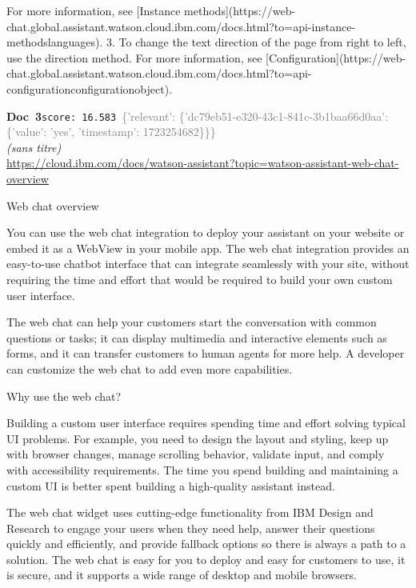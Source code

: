 \documentclass[a4paper,11pt]{article}
\begin{document}
\begin{docenv}
{For more information, see [Instance methods](https://web-chat.global.assistant.watson.cloud.ibm.com/docs.html?to=api-instance-methodslanguages).
3.  To change the text direction of the page from right to left, use the direction method. For more information, see [Configuration](https://web-chat.global.assistant.watson.cloud.ibm.com/docs.html?to=api-configurationconfigurationobject).









}
\end{docenv}
\begin{docenv}
{\footnotesize\textcolor{doccolor}{\textbf{Doc~3}}}\hfill{\tiny\texttt{score:~16.583}}\ {\tiny\textcolor{gray}{\{'relevant': \{'dc79eb51-e320-43c1-841c-3b1baa66d0aa': \{'value': 'yes', 'timestamp': 1723254682\}\}\}}}\\[3pt]
{\small\textit{(sans titre)}}\\[2pt]
{\tiny\url{https://cloud.ibm.com/docs/watson-assistant?topic=watson-assistant-web-chat-overview}}\\[4pt]
{\footnotesize 
Web chat overview 

You can use the web chat integration to deploy your assistant on your website or embed it as a WebView in your mobile app. The web chat integration provides an easy-to-use chatbot interface that can integrate seamlessly with your site, without requiring the time and effort that would be required to build your own custom user interface.

The web chat can help your customers start the conversation with common questions or tasks; it can display multimedia and interactive elements such as forms, and it can transfer customers to human agents for more help. A developer can customize the web chat to add even more capabilities.



 Why use the web chat? 

Building a custom user interface requires spending time and effort solving typical UI problems. For example, you need to design the layout and styling, keep up with browser changes, manage scrolling behavior, validate input, and comply with accessibility requirements. The time you spend building and maintaining a custom UI is better spent building a high-quality assistant instead.

The web chat widget uses cutting-edge functionality from IBM Design and Research to engage your users when they need help, answer their questions quickly and efficiently, and provide fallback options so there is always a path to a solution. The web chat is easy for you to deploy and easy for customers to use, it is secure, and it supports a wide range of desktop and mobile browsers.

}
\end{docenv}
\end{document}
